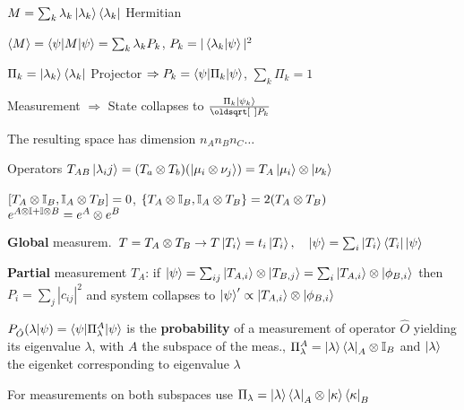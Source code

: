 \begin{squishlist}
    \item $M = \sum_k \lambda_k \ket{\lambda_k} \bra{\lambda_k}$ Hermitian
    \item $\braket{M} = \braket{\psi|M|\psi} = \sum_k \lambda_k P_k$, $P_k = |\braket{\lambda_k | \psi}|^2$
    \item $\Pi_k = \ket{\lambda_k}\bra{\lambda_k}$ Projector $\Rightarrow P_k = \braket{\psi| \Pi_k | \psi}$, $\sum_k \Pi_k = 1$
    \item Measurement $\Rightarrow$ State collapses to $\frac{\Pi_k \ket{\psi_k}}{\sqrt{P_k}}$
\end{squishlist}

\begin{squishlist}
    \item The resulting space has dimension $n_A n_B n_C \ldots$
    \item Operators $T_{AB} \ket{\lambda_ij} = (T_a \otimes T_b) (\ket{\mu_i \otimes \nu_j}) = T_A \ket{\mu_i} \otimes \ket{\nu_k}$
    \item $[T_A \otimes \mathbb{I}_B, \mathbb{I}_A \otimes T_B] = 0$, \quad $\{ T_A \otimes \mathbb{I}_B, \mathbb{I}_A \otimes T_B\} = 2 (T_A \otimes T_B)$ \\
        $e^{A \otimes \mathbb{I} + \mathbb{I} \otimes B} = e^A \otimes e^B$

    \item \textbf{Global} measurem.\ $T = T_A \otimes T_B \rightarrow T \ket{T_i} = t_i \ket{T_i}, \quad \ket{\psi} = \sum_i \ket{T_i} \bra{T_i}\ket{\psi}$ 
    \item \textbf{Partial} measurement $T_A$: if $\ket{\psi} = \sum_{ij} \ket{T_{A,i}} \otimes \ket{T_{B,j}} = \sum_i \ket{T_{A,i}} \otimes \ket{\phi_{B,i}}$
        then $P_i = \sum_j |c_{ij}|^2$ and system collapses to $\ket{\psi}' \propto \ket{T_{A,i}} \otimes \ket{\phi_{B,i}}$

    \item $P_{\hat{O}}(\lambda | \psi) = \braket{\psi | \Pi^{A}_{\lambda} | \psi }$ is the \textbf{probability} of a measurement of operator $\hat{O}$ yielding its eigenvalue $\lambda$, with $A$ the subspace of the meas., $\Pi_{\lambda}^A = \ket{\lambda}\bra{\lambda}_A \otimes \mathbb{I}_B$ and
    $\ket{\lambda}$ the eigenket corresponding to eigenvalue $\lambda$

    For measurements on both subspaces use $\Pi_{\lambda} = \ket{\lambda}\bra{\lambda}_A \otimes \ket{\kappa}\bra{\kappa}_B$


\end{squishlist}
